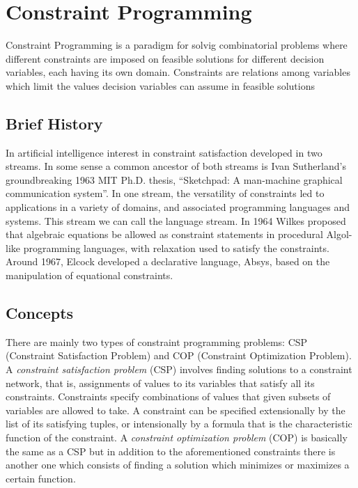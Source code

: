 \section{Constraint Programming}\label{sec:constraint_programming}

Constraint Programming is a paradigm for solvig combinatorial problems where
different constraints are imposed on feasible solutions for different decision variables, each having
its own domain. Constraints are relations among variables which limit the values decision variables
can assume in feasible solutions \cite{10.5555/2843512}

\subsection{Brief History}\label{subsec:brief_history}
In artificial intelligence interest in constraint satisfaction developed in two streams. In
some sense a common ancestor of both streams is Ivan Sutherland’s groundbreaking 1963
MIT Ph.D. thesis, “Sketchpad: A man-machine graphical communication system”.
In one stream, the versatility of constraints led to applications in a variety of domains,
and associated programming languages and systems. This stream we can call the language
stream. In 1964 Wilkes proposed that algebraic equations be allowed as constraint statements
in procedural Algol-like programming languages, with relaxation used to satisfy the
constraints. Around 1967, Elcock developed a declarative language, Absys, based on
the manipulation of equational constraints.

\subsection{Concepts}\label{subsec:concepts_cp}

There are mainly two types of constraint programming problems: CSP (Constraint Satisfaction Problem) and COP (Constraint Optimization Problem).\newline\newline
A \textit{constraint satisfaction problem} (CSP) involves finding solutions to a constraint network,
that is, assignments of values to its variables that satisfy all its constraints. Constraints
specify combinations of values that given subsets of variables are allowed to take.\newline
A constraint can be specified extensionally by the list of its satisfying tuples, or intensionally
by a formula that is the characteristic function of the constraint.\newline\newline
A \textit{constraint optimization problem} (COP) is basically the same as a CSP but in addition to the aforementioned constraints there is another one
which consists of finding a solution which minimizes or maximizes a certain function.


